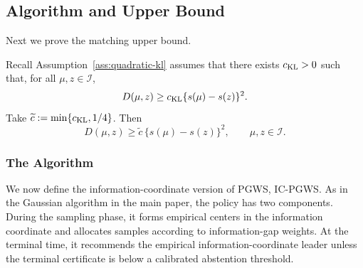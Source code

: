 \documentclass[10pt]{article}
\theoremstyle{plain}
\begin{document}
\subsection{Algorithm and Upper Bound}
\label{subsec:simple-transfer-upper}

Next we prove the matching upper bound.

Recall Assumption~\ref{ass:quadratic-kl} assumes that there exists \(c_{\rm KL}>0\) such that, for all \(\mu,z\in\mathcal I\),
$$
    D(\mu,z)
    \ge
    c_{\rm KL}\{s(\mu)-s(z)\}^2 .
$$
Take $\widetilde{c}:=\min\{c_{\rm KL},1/4\}$.
Then
\begin{equation}
\label{eq:ckl-under-simple-upper}
    D(\mu,z)
    \ge
    \widetilde{c}\,\{s(\mu)-s(z)\}^2,
    \qquad \mu,z\in\mathcal I .
\end{equation}


\subsubsection{The Algorithm}
We now define the information-coordinate version of PGWS,
\textsc{IC-PGWS}.  As in the Gaussian algorithm in the main paper, the policy
has two components.  During the sampling phase, it forms empirical centers in
the information coordinate and allocates samples according to information-gap
weights.  At the terminal time, it recommends the empirical information-coordinate leader unless the terminal certificate is below a calibrated
abstention threshold.
\end{document}

